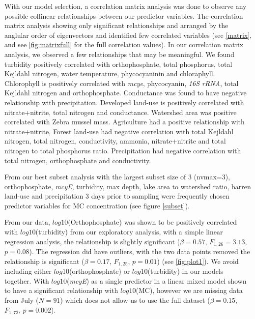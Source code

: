 With our model selection, a correlation matrix analysis was done to observe any possible collinear relationships between our predictor variables. The correlation matrix analysis showing only significant relationships and arranged by the anglular order of eigenvectors and identified few correlated variables  (see \ref{matrix}, and see \ref{fig:matrixfull} for the full correlation values). In our correlation matrix analysis, we observed a few relationships that may be meaningful. We found turbidity positively correlated with orthophosphate, total phosphorus, total Kejldahl nitrogen, water temperature, phycocyaninin and chloraphyll. Chlorophyll is positively correlated with \emph{mcye}, phycocyanin, \emph{16S rRNA}, total Kejldahl nitrogen and orthophosphate. Conductance was found to have negative relationship with precipitation.
Developed land-use is positively correlated with nitrate+nitrite, total nitrogen and conductance.
Watershed area was positive correlated with Zebra mussel mass.
Agriculture had a positive relationship with nitrate+nitrite,
Forest land-use had negative correlation with total Kejldahl nitrogen, total nitrogen, conductivity, ammonia, nitrate+nitrite and total nitrogen to total phosphorus ratio.
Precipitation had negative correlation with total nitrogen, orthophosphate and conductivity.

From our best subset analysis with the largest subset size of 3 (nvmax=3),  orthophosphate, \emph{mcyE}, turbidity, max depth,  lake area to watershed ratio, barren land-use and precipitation 3 days prior to sampling were frequently chosen  predictor variables for MC concentration (see figure \ref{subset}).


From our data, $log10$(Orthophosphate) was shown to be positively correlated with $log10$(turbidity) from our exploratory analysis, with a simple linear regression analysis, the relationship is slightly significant ($\beta=0.57$, $F_{{1,26}}=3.13$, $p=0.08$). The regression did have outliers, with the two data points removed the relationship is significant ($\beta=0.17$, $F_{{1,25}}$, $p=0.01$) (see \ref{fig:plot1}). We avoid including either $log10$(orthophosphate) or $log10$(turbidity) in our models together.
With $log10$(\emph{mcyE}) as a single predictor in a linear mixed model shown to have a significant relationship with $log10$(MC), however we are missing data from July ($N=91$) which does not allow us to use the full dataset ($\beta=0.15$, $F_{{1,72}}$, $p=0.002$).

